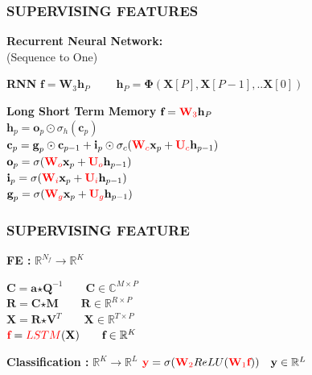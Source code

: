 \documentclass{beamer}
\begin{document}
\begin{frame}
\frametitle{SUPERVISING FEATURES}
\textbf{Recurrent Neural Network:}\\
(Sequence to One)

\begin{block}{\textbf{RNN}}
$\textbf{f} = \textbf{W}_{3}\textbf{h}_{P}$
$\qquad \textbf{h}_{P} = \bm{\Phi}(\textbf{X}[P], \textbf{X}[P-1], ..\textbf{X}[0])$
\end{block}
\begin{block}{\textbf{Long Short Term Memory}}
$\textbf{f} = {\color{red}\textbf{W}_{3}}\textbf{h}_{P}$\\
$\textbf{h}_{p} = \textbf{o}_{p} \odot \sigma_{h} (\textbf{c}_{p})$\\
$\textbf{c}_{p} = \textbf{g}_{p} \odot \textbf{c}_{p-1} + \textbf{i}_{p}  \odot \sigma_{c} ({\color{red}\textbf{W}_{c}}\textbf{x}_{p} + {\color{red}\textbf{U}_{c}}\textbf{h}_{p-1})$\\
$\textbf{o}_{p} = \sigma ({\color{red}\textbf{W}_{o}}\textbf{x}_{p} + {\color{red}\textbf{U}_{o}}\textbf{h}_{p-1})$ \\
$\textbf{i}_{p} = \sigma ({\color{red}\textbf{W}_{i}}\textbf{x}_{p} + {\color{red}\textbf{U}_{i}}\textbf{h}_{p-1})$\\
$\textbf{g}_{p} = \sigma ({\color{red}\textbf{W}_{g}}\textbf{x}_{p} + {\color{red}{\textbf{U}_{g}}}\textbf{h}_{p-1})$\\  
\end{block}
\end{frame}

\begin{frame}
\frametitle{SUPERVISING FEATURE}
\begin{block}{\textbf{FE :} $\mathbb{R}^{N_{f}} \rightarrow \mathbb{R}^{K}$}

$\textbf{C} = \textbf{a} \bm{\star} \textbf{Q}^{-1} \qquad \textbf{C} \in \mathbb{C}^{M \times P}$\\
$\textbf{R} = \textbf{C} \bm{\star} \textbf{M} \qquad \textbf{R} \in \mathbb{R}^{R \times P}$\\
$\textbf{X} = \textbf{R} \bm{\star} \textbf{V}^{T} \qquad \textbf{X} \in \mathbb{R}^{T \times P}$\\
${\color{red}\textbf{f}} = {\color{red}LSTM}(\textbf{X}) \qquad \textbf{f} \in \mathbb{R}^{K}$\\
\end{block}

\begin{block}{\textbf{Classification :} $\mathbb{R}^{K} \rightarrow \mathbb{R}^{L}$}
${\color{red}\textbf{y}} = \sigma({\color{red}\textbf{W}_{2}}ReLU({\color{red}\textbf{W}_{1}}{\color{red}\textbf{f}})) \quad \textbf{y} \in \mathbb{R}^{L}$
\end{block}
\end{frame}
\end{document}
